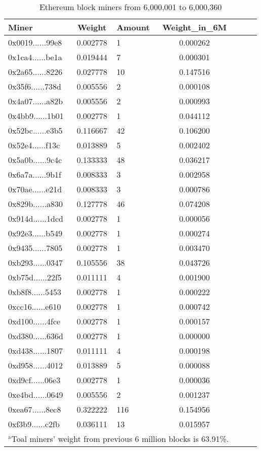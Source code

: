 \documentclass[conference]{IEEEtran}
\begin{document}
\begin{table}[htbp]
\caption{Ethereum block miners from 6,000,001 to 6,000,360}
\begin{center}
\begin{tabular}{lclclcl}
\hline
Miner                                      & Weight   & Amount & Weight\_in\_6M \\
\hline
0x0019......99e8 & 0.002778 & 1      & 0.000262   \\
0x1ca4......be1a & 0.019444 & 7      & 0.000301   \\
0x2a65......8226 & 0.027778 & 10     & 0.147516   \\
0x35f6......738d & 0.005556 & 2      & 0.000108   \\
0x4a07......a82b & 0.005556 & 2      & 0.000993   \\
0x4bb9......1b01 & 0.002778 & 1      & 0.044112   \\
0x52bc......e3b5 & 0.116667 & 42     & 0.106200   \\
0x52e4......f13c & 0.013889 & 5      & 0.002402   \\
0x5a0b......9c4c & 0.133333 & 48     & 0.036217   \\
0x6a7a......9b1f & 0.008333 & 3      & 0.002958   \\
0x70ae......e21d & 0.008333 & 3      & 0.000786   \\
0x829b......a830 & 0.127778 & 46     & 0.074208   \\
0x914d......1dcd & 0.002778 & 1      & 0.000056   \\
0x92e3......b549 & 0.002778 & 1      & 0.000274   \\
0x9435......7805 & 0.002778 & 1      & 0.003470   \\
0xb293......0347 & 0.105556 & 38     & 0.043726   \\
0xb75d......22f5 & 0.011111 & 4      & 0.001900   \\
0xb8f8......5453 & 0.002778 & 1      & 0.000222   \\
0xcc16......e610 & 0.002778 & 1      & 0.000742   \\
0xd100......4fce & 0.002778 & 1      & 0.000157   \\
0xd380......636d & 0.002778 & 1      & 0.000000   \\
0xd438......1807 & 0.011111 & 4      & 0.000198   \\
0xd958......4012 & 0.013889 & 5      & 0.000088   \\
0xd9cf......06e3 & 0.002778 & 1      & 0.000036   \\
0xe4bd......0649 & 0.005556 & 2      & 0.001237   \\
0xea67......8ec8 & 0.322222 & 116    & 0.154956   \\
0xf3b9......c2fb & 0.036111 & 13     & 0.015957  \\
\hline
\multicolumn{4}{l}{$^{\mathrm{a}}$Toal miners' weight from previous 6 million blocks is 63.91\%.}
\end{tabular}
\end{center}
\end{table}
\end{document}
